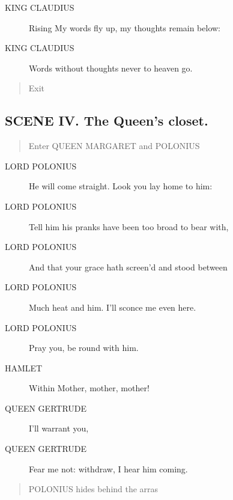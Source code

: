 \documentclass{article}
\begin{document}
\begin{description}
            
\item[KING CLAUDIUS] 
               Rising  My words fly up, my thoughts remain below:
\item[KING CLAUDIUS] Words without thoughts never to heaven go.
\end{description}
          
\begin{quote}
Exit
\end{quote}
          
\subsection{SCENE IV.  The Queen's closet.}
          
\begin{quote}
Enter QUEEN MARGARET and POLONIUS
\end{quote}
          
\begin{description}
            
\item[LORD POLONIUS] He will come straight. Look you lay home to him:
\item[LORD POLONIUS] Tell him his pranks have been too broad to bear with,
\item[LORD POLONIUS] And that your grace hath screen'd and stood between
\item[LORD POLONIUS] Much heat and him. I'll sconce me even here.
\item[LORD POLONIUS] Pray you, be round with him.
\end{description}
          
\begin{description}
            
\item[HAMLET] 
               Within  Mother, mother, mother!
\end{description}
          
\begin{description}
            
\item[QUEEN GERTRUDE] I'll warrant you,
\item[QUEEN GERTRUDE] Fear me not: withdraw, I hear him coming.
\end{description}
          
\begin{quote}
POLONIUS hides behind the arras
\end{quote}
          
\end{document}
